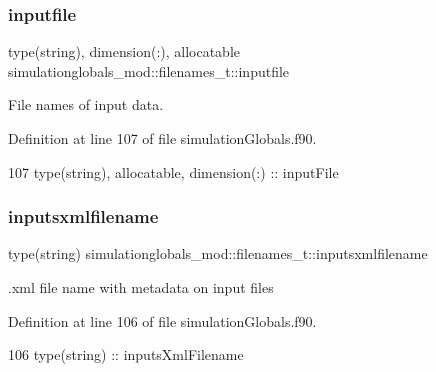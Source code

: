 \subsubsection{\texorpdfstring{inputfile}{inputfile}}
{\footnotesize\ttfamily type(string), dimension(\+:), allocatable simulationglobals\+\_\+mod\+::filenames\+\_\+t\+::inputfile\hspace{0.3cm}{\ttfamily [private]}}



File names of input data. 



Definition at line 107 of file simulation\+Globals.\+f90.


\begin{DoxyCode}
107         \textcolor{keywordtype}{type}(string), \textcolor{keywordtype}{allocatable}, \textcolor{keywordtype}{dimension(:)} :: inputFile
\end{DoxyCode}
\mbox{\label{structsimulationglobals__mod_1_1filenames__t_aef0d56123bd40e7f6a485680bad46345}} 
\subsubsection{\texorpdfstring{inputsxmlfilename}{inputsxmlfilename}}
{\footnotesize\ttfamily type(string) simulationglobals\+\_\+mod\+::filenames\+\_\+t\+::inputsxmlfilename\hspace{0.3cm}{\ttfamily [private]}}



.xml file name with metadata on input files 



Definition at line 106 of file simulation\+Globals.\+f90.


\begin{DoxyCode}
106         \textcolor{keywordtype}{type}(string) :: inputsXmlFilename
\end{DoxyCode}
\mbox{\label{structsimulationglobals__mod_1_1filenames__t_a5af6fa9ef520239ea544e0241a03259d}} 
